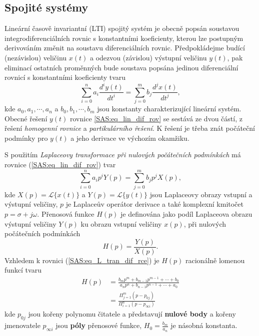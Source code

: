 {    \subsection{Spojité systémy}
      Lineární časově invariantní (LTI) spojitý systém je obecně popsán soustavou
      integrodiferenciálních rovnic s konstantními koeficienty, kterou lze postupným derivováním
      změnit na soustavu diferenciálních rovnic. Předpokládej\-me budící (ne\-zá\-vis\-lou) veličinu
      $x(t)$ a odezvou (závislou) výstupní veličinu $y(t)$, pak eliminací ostatních proměnných bude 
      soustava popsána jedinou diferenciální rovnicí s konstantními koeficienty tvaru
      \begin{equation}\label{SAS:eq_lin_dif_rov}
          \sum_{i=0}^na_i\frac{d^iy(t)}{dt^i}=\sum_{j=0}^mb_j\frac{d^jx(t)}{dt^j},
      \end{equation}
      kde $a_0, a_1, \cdots ,a_n$ a $b_0, b_1, \cdots ,b_m$ jsou konstanty charakterizující lineární
      systém. Obecné řešení $y(t)$ rovnice \ref{SAS:eq_lin_dif_rov} se sestává ze dvou částí, z 
      řešení \emph{homogenní rovnice} a \emph{partikulárního řešení}. K řešení je třeba znát 
      počáteční podmínky pro $y(t)$ a jeho derivace ve výchozím okamžiku.
  
      S použitím \emph{Laplaceovy transformace při nulových počátečních podmínkách} má rovnice
      (\ref{SAS:eq_lin_dif_rov}) tvar
      \begin{equation}\label{SAS:eq_L_tran_dif_rce}
        \sum_{i=0}^na_ip^iY(p)=\sum_{j=0}^mb_jp^jX(p),
      \end{equation}
      kde $X(p)=\mathcal{L}\{x(t)\}$ a $Y(p)=\mathcal{L}\{y(t)\}$ jsou Laplaceovy obrazy vstupní a
      výstupní veličiny, $p$ je Laplaceův operátor derivace a také komplexní kmitočet 
      $p=\sigma+j\omega$. Přenosová funkce $H(p)$ je definována jako podíl Laplaceova obrazu 
      výstupní veličiny $Y(p)$ ku obrazu vstupní veličiny $x(p)$, při nulových počátečních 
      podmínkách
      \begin{equation}\label{SAS:eq_Hp_popis}
          H(p)=\frac{Y(p)}{X(p)}.
      \end{equation}
      Vzhledem k rovnici (\ref{SAS:eq_L_tran_dif_rce}) je $H(p)$ racionálně lomenou funkcí tvaru
      \begin{align}
        H(p)&=\frac{b_mp^m+b_{m-1}p^{m-1}+\cdots+b_0}{a_np^n+b_{n-1}p^{n-1}+\cdots+a_0}  \nonumber\\
            &=\frac{\Pi_{j=1}^m(p-p_{0j})}{\Pi_{i=1}^n(p-p_{\infty i})}            \label{tky:eq002}
      \end{align}
      kde $p_{0j}$ jsou kořeny polynomu čitatele a představují \textbf{nulové body} a kořeny
      jmenovatele $p_{\infty i}$ jsou \textbf{póly} přenosové funkce, $H_0=\frac{b_m}{a_n}$ je
      násobná konstanta.
  
}
